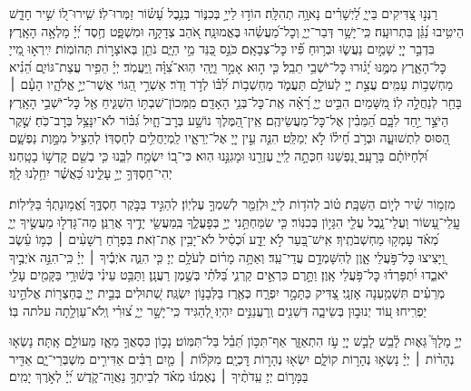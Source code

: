 \documentclass[twoside, openany, parskip=half, 11pt]{book}
\begin{document}
\begin{narrow}
רַנְּנ֣וּ צַ֭דִּיקִים בַּייָ֑
לַ֝יְשָׁרִ֗ים נָאוָ֥ה תְהִלָּֽה׃
הוֹד֣וּ לַייָ֣ בְּכִנּ֑וֹר בְּנֵ֥בֶל עָ֝שׂ֗וֹר זַמְּרוּ־לֽוֹ׃
שִֽׁירוּ־ל֭וֹ שִׁ֣יר חָדָ֑שׁ הֵיטִ֥יבוּ נַ֝גֵּ֗ן בִּתְרוּעָֽה׃
כִּֽי־יָשָׁ֥ר דְּבַר־יְיָ֑ וְכׇל־מַ֝עֲשֵׂ֗הוּ בֶּאֱמוּנָֽה׃
אֹ֭הֵב צְדָקָ֣ה וּמִשְׁפָּ֑ט חֶ֥סֶד יְ֝יָ֗ מָלְאָ֥ה הָאָֽרֶץ׃
בִּדְבַ֣ר יְיָ֭ שָׁמַ֣יִם נַעֲשׂ֑וּ וּבְר֥וּחַ פִּ֗֝יו כׇּל־צְבָאָֽם׃
כֹּנֵ֣ס כַּ֭נֵּד מֵ֣י הַיָּ֑ם נֹתֵ֖ן בְּאוֹצָר֣וֹת תְּהוֹמֽוֹת׃
יִֽירְא֣וּ מֵ֭ייָ כׇּל־הָאָ֑רֶץ מִמֶּ֥נּוּ יָ֝ג֗וּרוּ כׇּל־יֹשְׁבֵ֥י תֵבֵֽל׃
כִּ֤י ה֣וּא אָמַ֣ר וַיֶּ֑הִי הֽוּא־צִ֝וָּ֗ה וַֽיַּעֲמֹֽד׃
יְיָ֗ הֵפִ֥יר עֲצַת־גּוֹיִ֑ם הֵ֝נִ֗יא מַחְשְׁב֥וֹת עַמִּֽים׃
עֲצַ֣ת יְיָ֭ לְעוֹלָ֣ם תַּעֲמֹ֑ד מַחְשְׁב֥וֹת לִ֝בּ֗וֹ לְדֹ֣ר וָדֹֽר׃
אַשְׁרֵ֣י הַ֭גּוֹי אֲשֶׁר־יְיָ֣ אֱלֹהָ֑יו הָעָ֓ם ׀ בָּחַ֖ר לְנַחֲלָ֣ה לֽוֹ׃
מִ֭שָּׁמַיִם הִבִּ֣יט יְיָ֑ רָ֝אָ֗ה אֶֽת־כׇּל־בְּנֵ֥י הָאָדָֽם׃
מִֽמְּכוֹן־שִׁבְתּ֥וֹ הִשְׁגִּ֑יחַ אֶ֖ל כׇּל־יֹשְׁבֵ֣י הָאָֽרֶץ׃
הַיֹּצֵ֣ר יַ֣חַד לִבָּ֑ם הַ֝מֵּבִ֗ין אֶל־כׇּל־מַעֲשֵׂיהֶֽם׃
אֵֽין־הַ֭מֶּלֶךְ נוֹשָׁ֣ע בְּרׇב־חָ֑יִל גִּ֝בּ֗וֹר לֹא־יִנָּצֵ֥ל בְּרׇב־כֹּֽחַ׃
שֶׁ֣קֶר הַ֭סּוּס לִתְשׁוּעָ֑ה וּבְרֹ֥ב חֵ֝יל֗וֹ לֹ֣א יְמַלֵּֽט׃
הִנֵּ֤ה עֵ֣ין יְיָ֭ אֶל־יְרֵאָ֑יו לַֽמְיַחֲלִ֥ים לְחַסְדּֽוֹ׃
לְהַצִּ֣יל מִמָּ֣וֶת נַפְשָׁ֑ם וּ֝לְחַיּוֹתָ֗ם בָּרָעָֽב׃
נַ֭פְשֵׁנוּ חִכְּתָ֣ה לַֽייָ֑ עֶזְרֵ֖נוּ וּמָגִנֵּ֣נוּ הֽוּא׃
כִּי־ב֭וֹ יִשְׂמַ֣ח לִבֵּ֑נוּ כִּ֤י בְשֵׁ֖ם קׇדְשׁ֣וֹ בָטָֽחְנוּ׃
יְהִי־חַסְדְּךָ֣ יְיָ֣ עָלֵ֑ינוּ כַּ֝אֲשֶׁ֗ר יִחַ֥לְנוּ לָֽךְ׃


מִזְמ֥וֹר שִׁ֗יר לְי֣וֹם הַשַּׁבָּֽת׃\hfill \break
ט֗וֹב לְהֹד֥וֹת לַייָ֑ וּלְזַמֵּ֖ר לְשִׁמְךָ֣ עֶלְיֽוֹן׃
לְהַגִּ֣יד בַּבֹּ֣קֶר חַסְדֶּ֑ךָ וֶ֝אֱמ֥וּנָתְךָ֗ בַּלֵּילֽוֹת׃
עֲֽלֵי־עָ֭שׂוֹר וַעֲלֵי־נָ֑בֶל עֲלֵ֖י הִגָּי֣וֹן בְּכִנּֽוֹר׃
כִּ֤י שִׂמַּחְתַּ֣נִי יְיָ֣ בְּפׇעֳלֶ֑ךָ בְּֽמַעֲשֵׂ֖י יָדֶ֣יךָ אֲרַנֵּֽן׃
מַה־גָּדְל֣וּ מַעֲשֶׂ֣יךָ יְיָ֑ מְ֝אֹ֗ד עָמְק֥וּ מַחְשְׁבֹתֶֽיךָ׃
אִֽישׁ־בַּ֭עַר לֹ֣א יֵדָ֑ע וּ֝כְסִ֗יל לֹא־יָבִ֥ין אֶת־זֹֽאת׃
בִּפְרֹ֤חַ רְשָׁעִ֨ים ׀ כְּמ֥וֹ עֵ֗שֶׂב וַ֭יָּצִיצוּ כׇּל־פֹּ֣עֲלֵי אָ֑וֶן לְהִשָּׁמְדָ֥ם עֲדֵי־עַֽד׃
וְאַתָּ֥ה מָר֗וֹם לְעֹלָ֥ם יְיָ׃
כִּ֤י הִנֵּ֪ה אֹיְבֶ֡יךָ ׀ יְיָ֗ כִּֽי־הִנֵּ֣ה אֹיְבֶ֣יךָ יֹאבֵ֑דוּ יִ֝תְפָּרְד֗וּ כׇּל־פֹּ֥עֲלֵי אָֽוֶן׃
וַתָּ֣רֶם כִּרְאֵ֣ים קַרְנִ֑י בַּ֝לֹּתִ֗י בְּשֶׁ֣מֶן רַעֲנָֽן׃
וַתַּבֵּ֥ט עֵינִ֗י בְּשׁ֫וּרָ֥י בַּקָּמִ֖ים עָלַ֥י מְרֵעִ֗ים תִּשְׁמַ֥עְנָה אׇזְנָֽי׃
צַ֭דִּיק כַּתָּמָ֣ר יִפְרָ֑ח כְּאֶ֖רֶז בַּלְּבָנ֣וֹן יִשְׂגֶּֽה׃
שְׁ֭תוּלִים בְּבֵ֣ית יְיָ֑ בְּחַצְר֖וֹת אֱלֹהֵ֣ינוּ יַפְרִֽיחוּ׃
ע֭וֹד יְנוּב֣וּן בְּשֵׂיבָ֑ה דְּשֵׁנִ֖ים וְֽרַעֲנַנִּ֣ים יִהְיֽוּ׃
לְ֭הַגִּיד כִּֽי־יָשָׁ֣ר יְיָ֑ צ֝וּרִ֗י וְֽלֹא־עַוְלָ֥תָה עלתה בּֽוֹ׃



יְיָ֣ מָלָךְ֮ גֵּא֢וּת לָ֫בֵ֥שׁ
לָבֵ֣שׁ יְיָ֭ עֹ֣ז הִתְאַזָּ֑ר אַף־תִּכּ֥וֹן תֵּ֝בֵ֗ל בַּל־תִּמּֽוֹט׃
נָכ֣וֹן כִּסְאֲךָ֣ מֵאָ֑ז מֵעוֹלָ֣ם אָֽתָּה׃
נָשְׂא֤וּ נְהָר֨וֹת ׀ יְיָ֗ נָשְׂא֣וּ נְהָר֣וֹת קוֹלָ֑ם יִשְׂא֖וּ נְהָר֣וֹת דׇּכְיָֽם׃
מִקֹּל֨וֹת ׀ מַ֤יִם רַבִּ֗ים אַדִּירִ֣ים מִשְׁבְּרֵי־יָ֑ם אַדִּ֖יר בַּמָּר֣וֹם יְיָ׃
עֵֽדֹתֶ֨יךָ ׀ נֶאֶמְנ֬וּ מְאֹ֗ד לְבֵיתְךָ֥ נַאֲוָה־קֹ֑דֶשׁ יְ֝יָ֗ לְאֹ֣רֶךְ יָמִֽים׃

\end{narrow}
\end{document}
